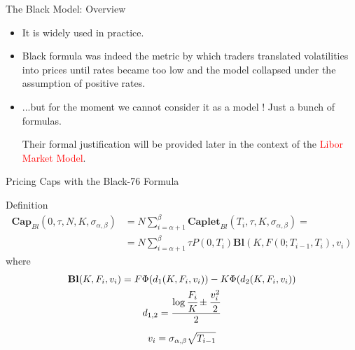 \documentclass{beamer}
\begin{document}

\begin{frame}{The Black Model: Overview}
	\begin{itemize}
		\item It is widely used in practice. 
		\item Black formula was indeed the metric by which traders translated volatilities into prices until rates became too low and the model collapsed under the assumption of positive rates.
		\item ...but for the moment we cannot consider it as a model ! Just a bunch of formulas.
		
		Their formal justification will be provided later in the context of the \textcolor{red}{Libor Market Model}.
	\end{itemize}
\end{frame}

\begin{frame}{Pricing Caps with the Black-76 Formula}
	\begin{block}{Definition}
	\begin{equation}
		\begin{aligned}
		\textbf{Cap}_{Bl}(0, \tau,N,K,\sigma_{\alpha,\beta}) &= N\sum_{i=\alpha+1}^{\beta}\textbf{Caplet}_{Bl}(T_i, \tau,K,\sigma_{\alpha,\beta}) = \\ &=N\sum_{i=\alpha+1}^{\beta}\tau P(0,T_i) \textbf{Bl}(K,F(0;T_{i-1},T_i),v_i)
		\end{aligned}
		\label{eq:cap_black}
	\end{equation}
	where
	\begin{equation*}
		\begin{gathered}
			\textbf{Bl}(K,F_i,v_i)=F\Phi(d_1(K,F_i,v_i)) - K\Phi(d_2(K,F_i,v_i)) \\
			d_{1,2} = \frac{\log{\cfrac{F_i}{K}} \pm \cfrac{v_i^2}{2}}{2} \\[0.2cm]
			v_i = \sigma_{\alpha,\beta}\sqrt{T_{i-1}}	
		\end{gathered}
	\end{equation*}
	\end{block}
\end{frame}
\end{document}
